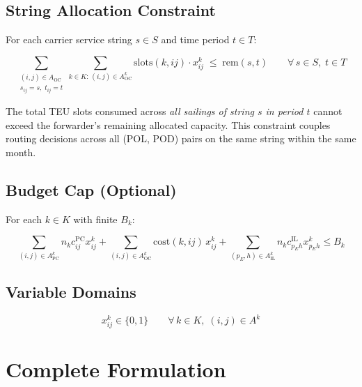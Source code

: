 \documentclass[11pt,a4paper]{article}
\theoremstyle{definition}
\begin{document}
\subsection{String Allocation Constraint}

For each carrier service string $s \in S$ and time period $t \in T$:

\begin{equation}
  \sum_{\substack{(i,j) \in A_{\text{OC}} \\ s_{ij} = s,\; t_{ij} = t}}
  \sum_{k \in K:\, (i,j) \in A^k_{\text{OC}}} \text{slots}(k,ij) \cdot x_{ij}^k
  \;\leq\; \text{rem}(s,t)
  \qquad \forall\, s \in S,\; t \in T
  \label{eq:alloc}
\end{equation}

The total TEU slots consumed across \emph{all sailings of string $s$ in period $t$} cannot
exceed the forwarder's remaining allocated capacity. This constraint couples routing decisions
across all (POL, POD) pairs on the same string within the same month.


\subsection{Budget Cap (Optional)}

For each $k \in K$ with finite $B_k$:

\begin{equation}
  \sum_{(i,j) \in A^k_{\text{PC}}} n_k c_{ij}^{\text{PC}} x_{ij}^k
  + \sum_{(i,j) \in A^k_{\text{OC}}} \text{cost}(k,ij)\, x_{ij}^k
  + \sum_{(p_E,h) \in A^k_{\text{IL}}} n_k c_{p_E h}^{\text{IL}} x_{p_E h}^k
  \leq B_k
  \label{eq:budget}
\end{equation}

\subsection{Variable Domains}

\begin{equation}
  x_{ij}^k \in \{0,1\} \qquad \forall\, k \in K,\; (i,j) \in A^k \label{eq:domain}
\end{equation}

\section{Complete Formulation}
\end{document}
